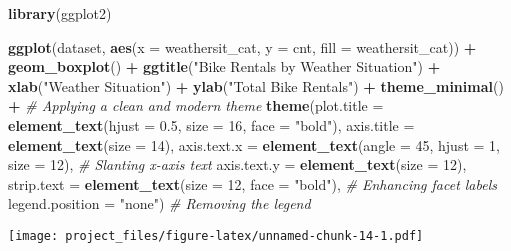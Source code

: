 \documentclass[
]{article}
\newenvironment{Shaded}{\begin{snugshade}}{\end{snugshade}}
\newcommand{\AttributeTok}[1]{\textcolor[rgb]{0.13,0.29,0.53}{#1}}
\newcommand{\CommentTok}[1]{\textcolor[rgb]{0.56,0.35,0.01}{\textit{#1}}}
\newcommand{\DecValTok}[1]{\textcolor[rgb]{0.00,0.00,0.81}{#1}}
\newcommand{\FloatTok}[1]{\textcolor[rgb]{0.00,0.00,0.81}{#1}}
\newcommand{\FunctionTok}[1]{\textcolor[rgb]{0.13,0.29,0.53}{\textbf{#1}}}
\newcommand{\NormalTok}[1]{#1}
\newcommand{\SpecialCharTok}[1]{\textcolor[rgb]{0.81,0.36,0.00}{\textbf{#1}}}
\newcommand{\StringTok}[1]{\textcolor[rgb]{0.31,0.60,0.02}{#1}}
\begin{document}
\begin{Shaded}
\begin{Highlighting}[]
\FunctionTok{library}\NormalTok{(ggplot2)}

\FunctionTok{ggplot}\NormalTok{(dataset, }\FunctionTok{aes}\NormalTok{(}\AttributeTok{x =}\NormalTok{ weathersit\_cat, }\AttributeTok{y =}\NormalTok{ cnt, }\AttributeTok{fill =}\NormalTok{ weathersit\_cat)) }\SpecialCharTok{+} 
    \FunctionTok{geom\_boxplot}\NormalTok{() }\SpecialCharTok{+} 
    \FunctionTok{ggtitle}\NormalTok{(}\StringTok{"Bike Rentals by Weather Situation"}\NormalTok{) }\SpecialCharTok{+}
    \FunctionTok{xlab}\NormalTok{(}\StringTok{"Weather Situation"}\NormalTok{) }\SpecialCharTok{+}
    \FunctionTok{ylab}\NormalTok{(}\StringTok{"Total Bike Rentals"}\NormalTok{) }\SpecialCharTok{+}
    \FunctionTok{theme\_minimal}\NormalTok{() }\SpecialCharTok{+}  \CommentTok{\# Applying a clean and modern theme}
    \FunctionTok{theme}\NormalTok{(}\AttributeTok{plot.title =} \FunctionTok{element\_text}\NormalTok{(}\AttributeTok{hjust =} \FloatTok{0.5}\NormalTok{, }\AttributeTok{size =} \DecValTok{16}\NormalTok{, }\AttributeTok{face =} \StringTok{"bold"}\NormalTok{),}
          \AttributeTok{axis.title =} \FunctionTok{element\_text}\NormalTok{(}\AttributeTok{size =} \DecValTok{14}\NormalTok{),}
          \AttributeTok{axis.text.x =} \FunctionTok{element\_text}\NormalTok{(}\AttributeTok{angle =} \DecValTok{45}\NormalTok{, }\AttributeTok{hjust =} \DecValTok{1}\NormalTok{, }\AttributeTok{size =} \DecValTok{12}\NormalTok{),  }\CommentTok{\# Slanting x{-}axis text}
          \AttributeTok{axis.text.y =} \FunctionTok{element\_text}\NormalTok{(}\AttributeTok{size =} \DecValTok{12}\NormalTok{),}
          \AttributeTok{strip.text =} \FunctionTok{element\_text}\NormalTok{(}\AttributeTok{size =} \DecValTok{12}\NormalTok{, }\AttributeTok{face =} \StringTok{"bold"}\NormalTok{), }\CommentTok{\# Enhancing facet labels}
          \AttributeTok{legend.position =} \StringTok{"none"}\NormalTok{)  }\CommentTok{\# Removing the legend}
\end{Highlighting}
\end{Shaded}

\texttt{[image: project\_files/figure-latex/unnamed-chunk-14-1.pdf]}
\end{document}
